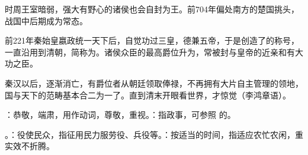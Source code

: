 {{\begin{lyenumerate}
时周王室暗弱，强大有野心的诸侯也会自封为王。前704年偏处南方的楚国挑头，战国中后期成为常态。

\item {}前221年秦始皇嬴政统一天下后，自觉功过三皇，德兼五帝，于是创造了的称号，一直沿用到清朝，简称为。诸侯众臣的最高爵位升为，常被封与皇帝的近亲和有大功之臣。

秦汉以后，逐渐消亡，有爵位者从朝廷领取俸禄，不再拥有大片自主管理的领地，国与天下的范畴基本合二为一了。直到清末开眼看世界，才惊觉（李鸿章语）。
\end{lyenumerate}
}

\item {}：恭敬，端肃，用作动词，尊敬，重视。：指政事，可参照  的。
\item {}。：役使民众，指征用民力服劳役、兵役等。：按适当的时间，指适应农忙农闲，重实效不折腾。
}
{}


